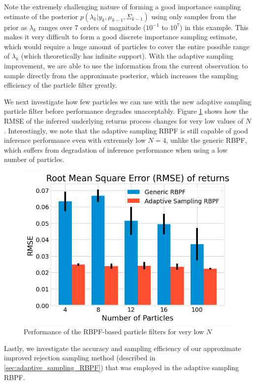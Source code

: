 \documentclass[../main.tex]{subfiles}
\begin{document}
Note the extremely challenging nature of forming a good importance sampling estimate of the posterior $p(\lambda_k | y_k, \mu_{k-1}, \Sigma_{k-1})$ using only samples from the prior as $\lambda_k$ ranges over 7 orders of magnitude ($10^{-1}$ to $10^7$) in this example. This makes it very difficult to form a good discrete importance sampling estimate, which would require a huge amount of particles to cover the entire possible range of $\lambda_k$ (which theoretically has infinite support). With the adaptive sampling improvement, we are able to use the information from the current observation to sample directly from the approximate posterior, which increases the sampling efficiency of the particle filter greatly. 

We next investigate how few particles we can use with the new adaptive sampling particle filter before performance degrades unacceptably. Figure \ref{fig:4__1__1__very_small_N} shows how the RMSE of the inferred underlying returns process changes for very low values of $N$. Interestingly, we note that the adaptive sampling RBPF is still capable of good inference performance even with extremely low $N = 4$, unlike the generic RBPF, which suffers from degradation of inference performance when using a low number of particles. 

\begin{figure}[h!]
	\centering
	\includegraphics[width=12.0cm]{../plots/4__1__1__very_small_N.png}
	\caption{Performance of the RBPF-based particle filters for very low $N$}
	\label{fig:4__1__1__very_small_N}
\end{figure}

Lastly, we investigate the accuracy and sampling efficiency of our approximate improved rejection sampling method (described in \autoref{sec:adaptive_sampling_RBPF}) that was employed in the adaptive sampling RBPF. 
\end{document}
